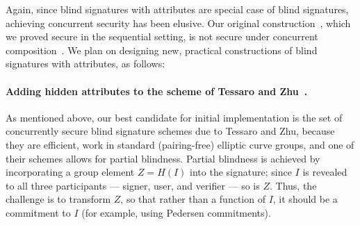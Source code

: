 Again, since blind signatures with attributes are special case of blind signatures, achieving concurrent security has been elusive. Our original construction~\cite{CCS:BalLys13}, which we proved secure in the sequential setting, is not secure under concurrent composition~\cite{EC:BLLOR21}.  We plan on designing new, practical constructions of blind signatures with attributes, as follows:

\paragraph{Adding hidden attributes to the scheme of Tessaro and Zhu~\cite{EC:TesZhu22}.}  As mentioned above, our best candidate for initial implementation is the set of concurrently secure blind signature schemes due to Tessaro and Zhu, because they are efficient, work in standard (pairing-free) elliptic curve groups, and one of their schemes allows for partial blindness.  Partial blindness is achieved by incorporating a group element $Z= H(I)$ into the signature; since $I$ is revealed to all three participants --- signer, user, and verifier --- so is $Z$.  Thus, the challenge is to transform $Z$, so that rather than a function of $I$, it should be a commitment to $I$ (for example, using Pedersen commitments).  

